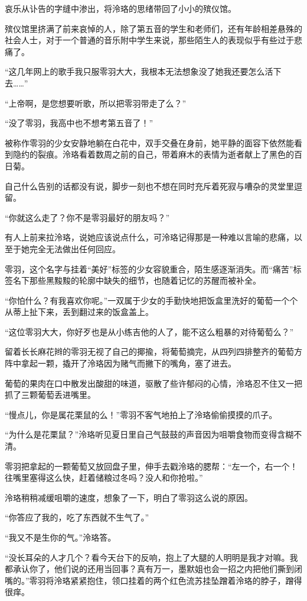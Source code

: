 \documentclass[UTF8, scheme = chinese, openany]{ctexbook}
\begin{document}
哀乐从讣告的字缝中渗出，将泠珞的思绪带回了小小的殡仪馆。

殡仪馆里挤满了前来哀悼的人，除了第五音的学生和老师们，还有年龄相差悬殊的社会人士，对于一个普通的音乐附中学生来说，那些陌生人的表现似乎有些过于悲痛了。

“这几年网上的歌手我只服零羽大大，我根本无法想象没了她我还要怎么活下去……”

“上帝啊，是您想要听歌，所以把零羽带走了么？”

“没了零羽，我高中也不想考第五音了！”

被称作零羽的少女安静地躺在白花中，双手交叠在身前，她平静的面容下依然能看到隐约的裂痕。泠珞看着数周之前的自己，带着麻木的表情为逝者献上了黑色的百日菊。

自己什么告别的话都没有说，脚步一刻也不想在同时充斥着死寂与嘈杂的灵堂里逗留。

“你就这么走了？你不是零羽最好的朋友吗？”

有人上前来拉泠珞，说她应该说点什么，可泠珞记得那是一种难以言喻的悲痛，以至于她完全无法做出任何回应。

零羽，这个名字与挂着“美好”标签的少女容貌重合，陌生感逐渐消失。而“痛苦”标签名下那些黑黢黢的轮廓中缺失的细节，也随着记忆的苏醒而被补全。

“你怕什么？有我喜欢你呢。”一双属于少女的手勤快地把饭盒里洗好的葡萄一个个从蒂上扯下来，丢到翻过来的饭盒盖上。

“这位零羽大大，你好歹也是从小练吉他的人了，能不这么粗暴的对待葡萄么？”

留着长长麻花辫的零羽无视了自己的揶揄，将葡萄摘完，从四列四排整齐的葡萄方阵中拿起一颗，撬开了泠珞因为赌气而撇下的嘴角，塞了进去。

葡萄的果肉在口中散发出酸甜的味道，驱散了些许郁闷的心情，泠珞忍不住又一把抓了三颗葡萄丢进嘴里。

“慢点儿，你是属花栗鼠的么！”零羽不客气地拍上了泠珞偷偷摸摸的爪子。

“为什么是花栗鼠？”泠珞听见夏日里自己气鼓鼓的声音因为咀嚼食物而变得含糊不清。

零羽把拿起的一颗葡萄又放回盘子里，伸手去戳泠珞的腮帮：“左一个，右一个！往嘴里塞得这么快，赶着储粮过冬吗？没人和你抢啦。”

泠珞稍稍减缓咀嚼的速度，想象了一下，明白了零羽这么说的原因。

“你答应了我的，吃了东西就不生气了。”

“我又不是生你的气。”泠珞答。

“没长耳朵的人才几个？看今天台下的反响，抱上了大腿的人明明是我才对嘛。我都承认你了，他们说的还用当回事？真有万一，墨默姐也会一招之内把他们撕到闭嘴的。”零羽将泠珞紧紧抱住，领口挂着的两个红色流苏挂坠蹭着泠珞的脖子，蹭得很痒。
\end{document}
